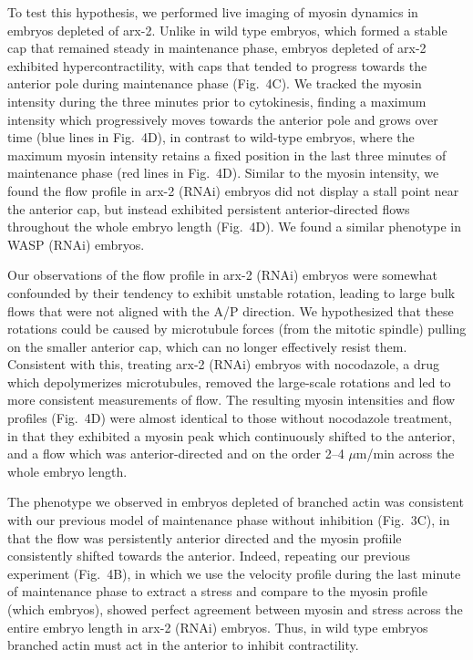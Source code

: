 \documentclass[11pt]{article}
\newcommand{\red}[1]{\color{red}#1\normalcolor}
\newcommand{\6}[1]{#1_{\text{6}}}
\newcommand{\3}[1]{#1_{\text{3}}}
\begin{document}
To test this hypothesis, we performed live imaging of myosin dynamics in embryos depleted of arx-2. Unlike in wild type embryos, which formed a stable cap that remained steady in maintenance phase, embryos depleted of arx-2 exhibited hypercontractility, with caps that tended to progress towards the anterior pole during maintenance phase (Fig.\ 4C). We tracked the myosin intensity during the three minutes prior to cytokinesis, finding a maximum intensity which progressively moves towards the anterior pole and grows over time (blue lines in Fig.\ 4D), in contrast to wild-type embryos, where the maximum myosin intensity retains a fixed position in the last three minutes of maintenance phase (red lines in Fig.\ 4D). Similar to the myosin intensity, we found the flow profile in arx-2 (RNAi) embryos did not display a stall point near the anterior cap, but instead exhibited persistent anterior-directed flows throughout the whole embryo length (Fig.\ 4D). \red{We found a similar phenotype in WASP (RNAi) embryos.}

Our observations of the flow profile in arx-2 (RNAi) embryos were somewhat confounded by their tendency to exhibit unstable rotation, leading to large bulk flows that were not aligned with the A/P direction. We hypothesized that these rotations could be caused by microtubule forces (from the mitotic spindle) pulling on the smaller anterior cap, which can no longer effectively resist them. Consistent with this, treating arx-2 (RNAi) embryos with nocodazole, a drug which depolymerizes microtubules, removed the large-scale rotations and led to more consistent measurements of flow. The resulting myosin intensities and flow profiles (Fig.\ 4D) were almost identical to those without nocodazole treatment, in that they exhibited a myosin peak which continuously shifted to the anterior, and a flow which was anterior-directed and on the order 2--4 $\mu$m/min across the whole embryo length.

The phenotype we observed in embryos depleted of branched actin was consistent with our previous model of maintenance phase without inhibition (Fig.\ 3C), in that the flow was persistently anterior directed and the myosin profiile consistently shifted towards the anterior. Indeed, repeating our previous experiment (Fig.\ 4B), in which we use the velocity profile during the last minute of maintenance phase to extract a stress and compare to the myosin profile \red{(which embryos)}, showed perfect agreement between myosin and stress across the entire embryo length in arx-2 (RNAi) embryos. Thus, in wild type embryos branched actin must act in the anterior to inhibit contractility.
\end{document}

